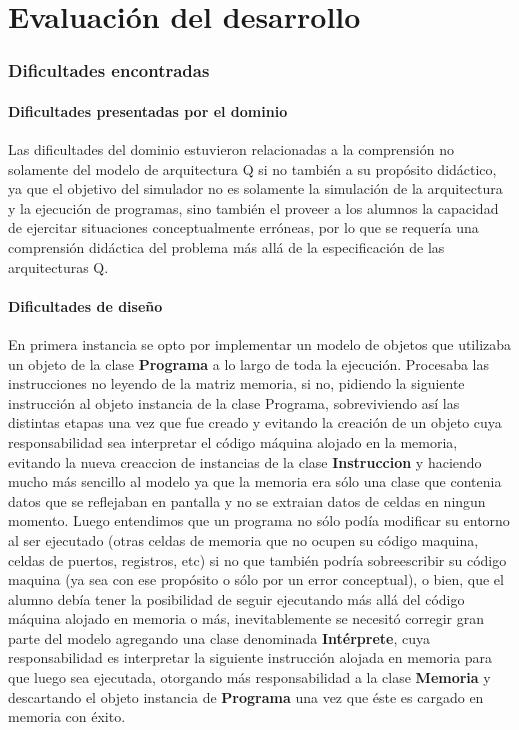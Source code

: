 \part{Evaluación del desarrollo}

\section{Dificultades encontradas}

\subsection{Dificultades presentadas por el dominio}
Las dificultades del dominio estuvieron relacionadas a la comprensión no solamente del modelo de arquitectura Q si no también a su propósito didáctico, ya que el objetivo del simulador no es solamente la simulación de la arquitectura y la ejecución de programas, sino también el proveer a los alumnos la capacidad de ejercitar situaciones conceptualmente erróneas, por lo que se requería una comprensión didáctica del problema más allá de la especificación de las arquitecturas Q. 


\subsection{Dificultades de diseño}
En primera instancia se opto por implementar un modelo de objetos que utilizaba un objeto de la clase \textbf{Programa} a lo largo de toda la ejecución. Procesaba las instrucciones no leyendo de la matriz memoria, si no, pidiendo la siguiente instrucción al objeto instancia de la clase Programa, sobreviviendo así las distintas etapas una vez que fue creado y evitando la creación de un objeto cuya responsabilidad sea interpretar el código máquina alojado en la memoria, evitando la nueva creaccion de instancias de la clase \textbf{Instruccion} y haciendo mucho más sencillo al modelo ya que la memoria era sólo una clase que contenia datos que se reflejaban en pantalla y no se extraian datos de celdas en ningun momento. Luego entendimos que un programa no sólo podía modificar su entorno al ser ejecutado (otras celdas de memoria que no ocupen su código maquina, celdas de puertos, registros, etc) si no que también podría sobreescribir su código maquina (ya sea con ese propósito o sólo por un error conceptual), o bien, que el alumno debía tener la posibilidad de seguir ejecutando más allá del código máquina alojado en memoria o más, inevitablemente se necesitó corregir gran parte del modelo agregando una clase denominada \textbf{Intérprete}, cuya responsabilidad es interpretar la siguiente instrucción alojada en memoria para que luego sea ejecutada, otorgando más responsabilidad a la clase \textbf{Memoria} y descartando el objeto instancia de \textbf{Programa} una vez que éste es cargado en memoria con éxito.\\


